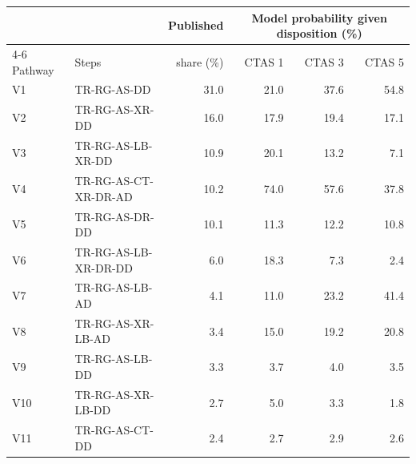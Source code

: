 \begin{tabular}{llrrrr}
\toprule
 & & Published & \multicolumn{3}{c}{Model probability given disposition (\%)} \\
\cmidrule(lr){4-6}
Pathway & Steps & share (\%) & CTAS 1 & CTAS 3 & CTAS 5 \\
\midrule
V1 & TR-RG-AS-DD & 31.0 & 21.0 & 37.6 & 54.8 \\
V2 & TR-RG-AS-XR-DD & 16.0 & 17.9 & 19.4 & 17.1 \\
V3 & TR-RG-AS-LB-XR-DD & 10.9 & 20.1 & 13.2 & 7.1 \\
V4 & TR-RG-AS-CT-XR-DR-AD & 10.2 & 74.0 & 57.6 & 37.8 \\
V5 & TR-RG-AS-DR-DD & 10.1 & 11.3 & 12.2 & 10.8 \\
V6 & TR-RG-AS-LB-XR-DR-DD & 6.0 & 18.3 & 7.3 & 2.4 \\
V7 & TR-RG-AS-LB-AD & 4.1 & 11.0 & 23.2 & 41.4 \\
V8 & TR-RG-AS-XR-LB-AD & 3.4 & 15.0 & 19.2 & 20.8 \\
V9 & TR-RG-AS-LB-DD & 3.3 & 3.7 & 4.0 & 3.5 \\
V10 & TR-RG-AS-XR-LB-DD & 2.7 & 5.0 & 3.3 & 1.8 \\
V11 & TR-RG-AS-CT-DD & 2.4 & 2.7 & 2.9 & 2.6 \\
\bottomrule
\end{tabular}